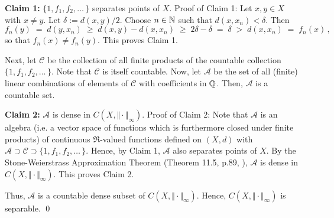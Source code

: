 \vskip 0.5cm
\noindent
\textbf{Claim 1:}\;\; $\{1, f_{1}, f_{2}, \ldots\,\}$ separates points of $X$.
\vskip 0.1cm
\noindent
Proof of Claim 1:\;\;
Let $x, y \in X$ with $x \neq y$. Let $\delta := d(x,y)/2$.
Choose $n \in \mathbb{N}$ such that $d(x,x_{n}) < \delta$. Then
\begin{equation*}
f_{n}(y) \;=\; d(y,x_{n}) \;\geq\; d(x,y) - d(x,x_{n}) \;\geq\; 2\delta - \delta \;=\; \delta \;>\; d(x,x_{n}) \;=\; f_{n}(x)\,,
\end{equation*}
so that $f_{n}(x) \neq f_{n}(y)$. This proves Claim 1.

\vskip 0.5cm
\noindent
Next, let $\mathcal{C}$ be the collection of all finite products of the countable collection
$\{1, f_{1}, f_{2}, \ldots\,\}$. 
Note that $\mathcal{C}$ is itself countable. Now, let $\mathcal{A}$ be the set of all
(finite) linear combinations of elements of $\mathcal{C}$ with coefficients in $\mathbb{Q}$.
Then, $\mathcal{A}$ is a countable set.

\vskip 0.5cm
\noindent
\textbf{Claim 2:}\;\; $\mathcal{A}$ is dense in $C(X,\Vert\cdot\Vert_{\infty})$.
\vskip 0.1cm
\noindent
Proof of Claim 2:\;\;
Note that $\mathcal{A}$ is an algebra (i.e. a vector space of functions
which is furthermore closed under finite products) of continuous $\Re$-valued
functions defined on $(X,d)$ with
$\mathcal{A} \supset \mathcal{C} \supset \{1,f_{1},f_{2},\ldots\,\}$. 
Hence, by Claim 1, $\mathcal{A}$ also separates points of $X$.
By the Stone-Weierstrass Approximation Theorem (Theorem 11.5, p.89, \cite{Aliprantis1998}),
$\mathcal{A}$ is dense in $C(X,\Vert\cdot\Vert_{\infty})$.
This proves Claim 2.

\vskip 0.5cm
\noindent
Thus, $\mathcal{A}$ is a countable dense subset of $C(X,\Vert\cdot\Vert_{\infty})$.
Hence, $C(X,\Vert\cdot\Vert_{\infty})$ is separable.
\qed


\renewcommand{\theenumi}{\roman{enumi}}
\renewcommand{\labelenumi}{\textnormal{(\theenumi)}$\;\;$}

